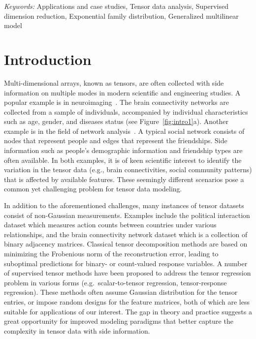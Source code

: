 \documentclass[12pt]{article}
\theoremstyle{plain}
\theoremstyle{definition}
\begin{document}
\noindent%
{\it Keywords:} Applications and case studies, Tensor data analysis, Supervised dimension reduction, Exponential family distribution, Generalized multilinear model
\vfill

\newpage
{} %
\section{Introduction}
\label{sec:intro}


Multi-dimensional arrays, known as tensors, are often collected with side information on multiple modes in modern scientific and engineering studies. A popular example is in neuroimaging~\citep{sun2017store,zhou2013tensor}. The brain connectivity networks are collected from a sample of individuals, accompanied by individual characteristics such as age, gender, and diseases status (see Figure~\ref{fig:intro1}a). Another example is in the field of network analysis~\citep{baldin2018optimal,hoff2005bilinear}. A typical social network consists of nodes that represent people and edges that represent the friendships. Side information such as people’s demographic information and friendship types are often available. In both examples, it is of keen scientific interest to identify the variation in the tensor data (e.g., brain connectivities, social community patterns) that is affected by available features. These seemingly different scenarios pose a common yet challenging problem for tensor data modeling. 

In addition to the aforementioned challenges, many instances of tensor datasets consist of non-Gaussian measurements. Examples include the political interaction dataset \citep{hu2015scalable} which measures action counts between countries under various relationships, and the brain connectivity network dataset \citep{wang2019common} which is a collection of binary adjacency matrices. Classical tensor decomposition methods are based on minimizing the Frobenious norm of the reconstruction error, leading to suboptimal predictions for binary- or count-valued response variables. A number of supervised tensor methods have been proposed \citep{narita2012tensor, zhao2012higher, yu2016learning} to address the tensor regression problem in various forms (e.g.\ scalar-to-tensor regression, tensor-response regression). These methods often assume Gaussian distribution for the tensor entries, or impose random designs for the feature matrices, both of which are less suitable for applications of our interest. The gap in theory and practice suggests a great opportunity for improved modeling paradigms that better capture the complexity in tensor data with side information.
\end{document}
